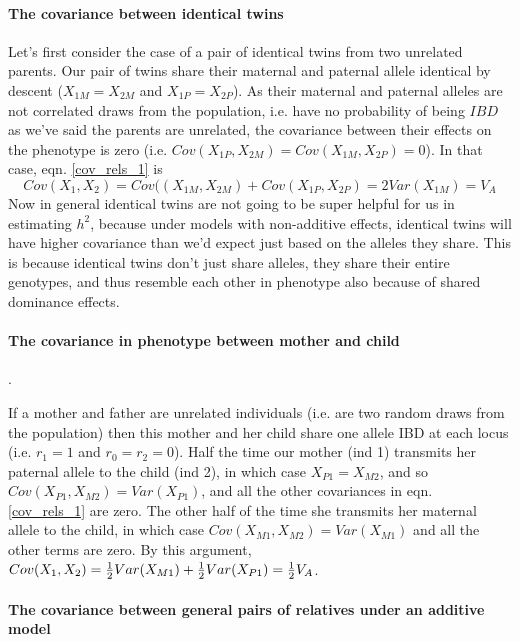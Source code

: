 \paragraph{The covariance between identical twins}
Let's first consider the case of a pair of identical twins from two
unrelated parents. Our pair of twins share their maternal and paternal
allele identical by descent ($X_{1M}=X_{2M}$ and $X_{1P}=X_{2P}$). As their maternal and
paternal alleles are not correlated draws from the population,
i.e. have no probability of being $IBD$ as we've said the parents are unrelated, the
covariance between their effects on the phenotype is zero  
(i.e. $Cov(X_{1P},X_{2M})=Cov(X_{1M},X_{2P})=0$). In that case,
eqn. \ref{cov_rels_1} is
\begin{equation}
Cov(X_1,X_2) = Cov((X_{1M},X_{2M})+Cov(X_{1P},X_{2P}) = 2Var(X_{1M})
= V_A
\end{equation}
Now in general identical twins are not going to be super helpful for
us in estimating $h^2$, because under models with non-additive effects, identical twins will have higher covariance than we'd expect just based on the alleles they share. This is because identical twins don't just share alleles, they share their entire genotypes, and thus 
resemble each other in phenotype also because of shared dominance effects. \\

\paragraph{The covariance in phenotype between mother and child}.


If a mother and father are unrelated individuals (i.e. are two
random draws from the population) then this mother and her child share
one allele IBD at each locus (i.e. $r_1=1$ and $r_0=r_2=0$). Half the
time our mother (ind 1) transmits her paternal allele to the child (ind 2), in which
case $X_{P1}=X_{M2}$, and so $Cov(X_{P1},X_{M2})=Var(X_{P1})$, and all
the other covariances in eqn. \ref{cov_rels_1} are zero. The other half of the time she transmits her maternal allele to the child, in which case
$Cov(X_{M1},X_{M2})=Var(X_{M1})$ and all the other terms are zero. By this
argument, $Cov(X_1,X_2) = \tfrac{1}{2} Var(X_{M1}) + \tfrac{1}{2} Var(X_{P1}) = \tfrac{1}{2}
V_A$. \\



\paragraph{The covariance between general pairs of relatives under an
additive model}



